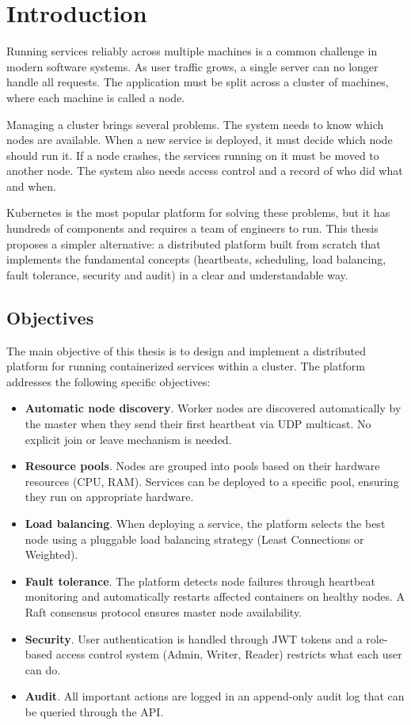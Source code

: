 \chapter{Introduction}
\label{cap:cap1}

Running services reliably across multiple machines is a common challenge in modern software systems. As user traffic grows, a single server can no longer handle all requests. The application must be split across a cluster of machines, where each machine is called a node.

Managing a cluster brings several problems. The system needs to know which nodes are available. When a new service is deployed, it must decide which node should run it. If a node crashes, the services running on it must be moved to another node. The system also needs access control and a record of who did what and when.

Kubernetes is the most popular platform for solving these problems, but it has hundreds of components and requires a team of engineers to run. This thesis proposes a simpler alternative: a distributed platform built from scratch that implements the fundamental concepts (heartbeats, scheduling, load balancing, fault tolerance, security and audit) in a clear and understandable way.

\section{Objectives}

The main objective of this thesis is to design and implement a distributed platform for running containerized services within a cluster. The platform addresses the following specific objectives:

\begin{itemize}
    \item \textbf{Automatic node discovery}. Worker nodes are discovered automatically by the master when they send their first heartbeat via UDP multicast. No explicit join or leave mechanism is needed.
    \item \textbf{Resource pools}. Nodes are grouped into pools based on their hardware resources (CPU, RAM). Services can be deployed to a specific pool, ensuring they run on appropriate hardware.
    \item \textbf{Load balancing}. When deploying a service, the platform selects the best node using a pluggable load balancing strategy (Least Connections or Weighted).
    \item \textbf{Fault tolerance}. The platform detects node failures through heartbeat monitoring and automatically restarts affected containers on healthy nodes. A Raft consensus protocol ensures master node availability.
    \item \textbf{Security}. User authentication is handled through JWT tokens and a role-based access control system (Admin, Writer, Reader) restricts what each user can do.
    \item \textbf{Audit}. All important actions are logged in an append-only audit log that can be queried through the API.
\end{itemize}

